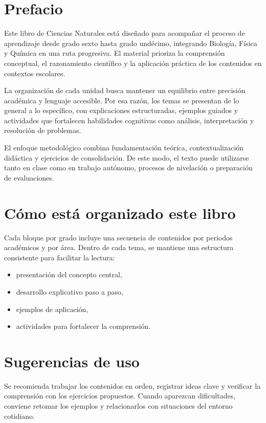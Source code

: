 \documentclass[
  spanish,
  letterpaper,
  12pt,
  oneside,
  open=any,
  DIV=15]{scrbook}
\providecommand{\tightlist}{%
  \setlength{\itemsep}{0pt}\setlength{\parskip}{0pt}}
\begin{document}
\section{Prefacio}\label{prefacio}

Este libro de Ciencias Naturales está diseñado para acompañar el proceso
de aprendizaje desde grado sexto hasta grado undécimo, integrando
Biología, Física y Química en una ruta progresiva. El material prioriza
la comprensión conceptual, el razonamiento científico y la aplicación
práctica de los contenidos en contextos escolares.

La organización de cada unidad busca mantener un equilibrio entre
precisión académica y lenguaje accesible. Por esa razón, los temas se
presentan de lo general a lo específico, con explicaciones
estructuradas, ejemplos guiados y actividades que fortalecen habilidades
cognitivas como análisis, interpretación y resolución de problemas.

El enfoque metodológico combina fundamentación teórica,
contextualización didáctica y ejercicios de consolidación. De este modo,
el texto puede utilizarse tanto en clase como en trabajo autónomo,
procesos de nivelación o preparación de evaluaciones.

\section{Cómo está organizado este
libro}\label{cuxf3mo-estuxe1-organizado-este-libro}

Cada bloque por grado incluye una secuencia de contenidos por periodos
académicos y por área. Dentro de cada tema, se mantiene una estructura
consistente para facilitar la lectura:

\begin{itemize}
\tightlist
\item
  presentación del concepto central,
\item
  desarrollo explicativo paso a paso,
\item
  ejemplos de aplicación,
\item
  actividades para fortalecer la comprensión.
\end{itemize}

\section{Sugerencias de uso}\label{sugerencias-de-uso}

Se recomienda trabajar los contenidos en orden, registrar ideas clave y
verificar la comprensión con los ejercicios propuestos. Cuando aparezcan
dificultades, conviene retomar los ejemplos y relacionarlos con
situaciones del entorno cotidiano.
\end{document}

